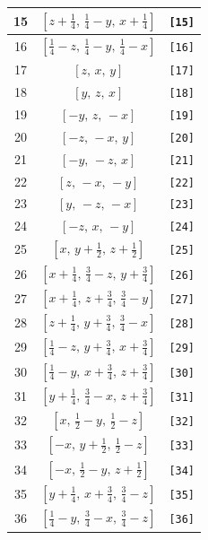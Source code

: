 \documentclass[fleqn,8pt]{jsarticle}
\begin{document}
\begin{longtable}{ccc}
15 & $\left[ z + \frac{1}{4},\, \frac{1}{4} - y,\, x + \frac{1}{4} \right]$ & {\tt [15]} \\ \hline
16 & $\left[ \frac{1}{4} - z,\, \frac{1}{4} - y,\, \frac{1}{4} - x \right]$ & {\tt [16]} \\ \hline
17 & $\left[ z,\, x,\, y \right]$ & {\tt [17]} \\ \hline
18 & $\left[ y,\, z,\, x \right]$ & {\tt [18]} \\ \hline
19 & $\left[ - y,\, z,\, - x \right]$ & {\tt [19]} \\ \hline
20 & $\left[ - z,\, - x,\, y \right]$ & {\tt [20]} \\ \hline
21 & $\left[ - y,\, - z,\, x \right]$ & {\tt [21]} \\ \hline
22 & $\left[ z,\, - x,\, - y \right]$ & {\tt [22]} \\ \hline
23 & $\left[ y,\, - z,\, - x \right]$ & {\tt [23]} \\ \hline
24 & $\left[ - z,\, x,\, - y \right]$ & {\tt [24]} \\ \hline
25 & $\left[ x,\, y + \frac{1}{2},\, z + \frac{1}{2} \right]$ & {\tt [25]} \\ \hline
26 & $\left[ x + \frac{1}{4},\, \frac{3}{4} - z,\, y + \frac{3}{4} \right]$ & {\tt [26]} \\ \hline
27 & $\left[ x + \frac{1}{4},\, z + \frac{3}{4},\, \frac{3}{4} - y \right]$ & {\tt [27]} \\ \hline
28 & $\left[ z + \frac{1}{4},\, y + \frac{3}{4},\, \frac{3}{4} - x \right]$ & {\tt [28]} \\ \hline
29 & $\left[ \frac{1}{4} - z,\, y + \frac{3}{4},\, x + \frac{3}{4} \right]$ & {\tt [29]} \\ \hline
30 & $\left[ \frac{1}{4} - y,\, x + \frac{3}{4},\, z + \frac{3}{4} \right]$ & {\tt [30]} \\ \hline
31 & $\left[ y + \frac{1}{4},\, \frac{3}{4} - x,\, z + \frac{3}{4} \right]$ & {\tt [31]} \\ \hline
32 & $\left[ x,\, \frac{1}{2} - y,\, \frac{1}{2} - z \right]$ & {\tt [32]} \\ \hline
33 & $\left[ - x,\, y + \frac{1}{2},\, \frac{1}{2} - z \right]$ & {\tt [33]} \\ \hline
34 & $\left[ - x,\, \frac{1}{2} - y,\, z + \frac{1}{2} \right]$ & {\tt [34]} \\ \hline
35 & $\left[ y + \frac{1}{4},\, x + \frac{3}{4},\, \frac{3}{4} - z \right]$ & {\tt [35]} \\ \hline
36 & $\left[ \frac{1}{4} - y,\, \frac{3}{4} - x,\, \frac{3}{4} - z \right]$ & {\tt [36]} \\ \hline

\end{longtable}
\end{document}
